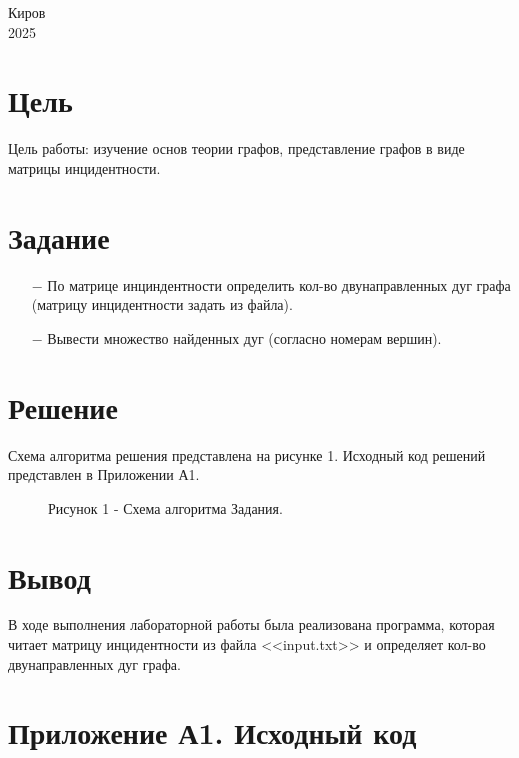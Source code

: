 \documentclass[oneside,a4paper,14pt]{extarticle}
\begin{document}
\begin{center}
	Киров\\
	2025
\end{center}

\newpage\thispagestyle{plain}

\section*{Цель}

Цель работы: изучение основ теории графов, представление графов в виде матрицы инцидентности.

\section*{Задание}
\begin{itemize}
	\item[$-$] По матрице инциндентности определить кол-во двунаправленных дуг графа (матрицу инцидентности задать из файла). 
  \item[$-$] Вывести множество найденных дуг (согласно номерам вершин).
\end{itemize}
\section*{Решение}

Схема алгоритма решения представлена на рисунке 1. Исходный код решений представлен в Приложении А1.

\clearpage
\begin{figure}[H]
	\centering
	\caption*{Рисунок 1 - Схема алгоритма Задания.}
\end{figure}

\section*{Вывод}


В ходе выполнения лабораторной работы была реализована программа, которая читает матрицу инцидентности из файла <<input.txt>> и определяет кол-во двунаправленных дуг графа.
\newpage
\section*{Приложение А1. Исходный код}
\inputminted{rust}{src/main.rs}
\end{document}
